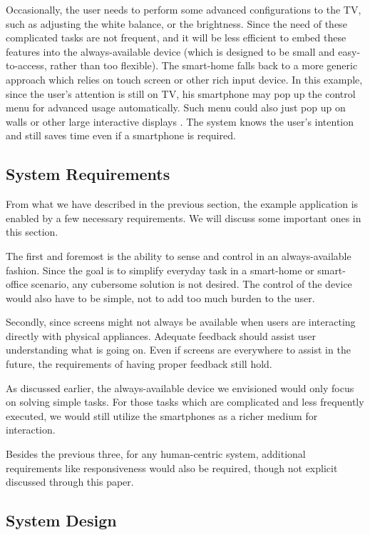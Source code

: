 Occasionally, the user needs to perform some advanced configurations to the TV, such as adjusting the white balance, or the brightness. Since the need of these complicated tasks are not frequent, and it will be less efficient to embed these features into the always-available device (which is designed to be small and easy-to-access, rather than too flexible). The smart-home falls back to a more generic approach which relies on touch screen or other rich input device. In this example, since the user's attention is still on TV, his smartphone may pop up the control menu for advanced usage automatically. Such menu could also just pop up on walls or other large interactive displays \cite{unPad:eWallpaper, MSVision}. The system knows the user's intention and still saves time even if a smartphone is required.

\subsection{System Requirements}
\label{sec:system-requirements}

From what we have described in the previous section, the example application is enabled by a few necessary requirements. We will discuss some important ones in this section.

The first and foremost is the ability to sense and control in an always-available fashion. Since the goal is to simplify everyday task in a smart-home or smart-office scenario, any cubersome solution is not desired. The control of the device would also have to be simple, not to add too much burden to the user.

Secondly, since screens might not always be available when users are interacting directly with physical appliances. Adequate feedback should assist user understanding what is going on. Even if screens are everywhere to assist in the future, the requirements of having proper feedback still hold.

As discussed earlier, the always-available device we envisioned would only focus on solving simple tasks. For those tasks which are complicated and less frequently executed, we would still utilize the smartphones as a richer medium for interaction.

Besides the previous three, for any human-centric system, additional requirements like responsiveness would also be required, though not explicit discussed through this paper.

\subsection{System Design}
\label{sec:system-design}

